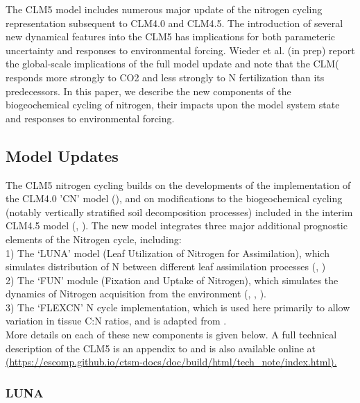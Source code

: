 \documentclass[draft,linenumbers]{agujournal}
\begin{document}
The CLM5 model includes numerous major update of the nitrogen cycling representation subsequent to CLM4.0 and CLM4.5. The introduction of several new dynamical features into the CLM5 has implications for both parameteric uncertainty and responses to environmental forcing. Wieder et al. (in prep) report the global-scale implications of the full model update and note that the CLM( responds more strongly to CO2 and less strongly to N fertilization than its predecessors. In this paper, we describe the new components of the biogeochemical cycling of nitrogen, their impacts upon the model system state and responses to environmental forcing.


\subsection{Model Updates}

The CLM5 nitrogen cycling builds on the developments of the implementation of the CLM4.0 'CN' model (\cite{thornton2007}), and on modifications to the biogeochemical cycling (notably vertically stratified soil decomposition processes) included in the interim CLM4.5 model (\cite{koven2013}, \cite{bonan2012}). The new model integrates three major additional prognostic elements of the Nitrogen cycle, including: \\


1) The `LUNA' model (Leaf Utilization of Nitrogen for Assimilation), which simulates distribution of N between different leaf assimilation processes (\cite{xu2012}, \cite{ali2016}) \\

2) The `FUN' module (Fixation and Uptake of Nitrogen), which simulates the dynamics of Nitrogen acquisition from the environment (\cite{fisher2010fun}, \cite{brzostek2014}, \cite{shi2016}).\\

3) The `FLEXCN' N cycle implementation, which is used here primarily to allow variation in tissue C:N ratios, and is adapted from \cite{ghimire2016}.\\



More details on each of these new components is given below. A full technical description of the CLM5 is an appendix to \cite{lawrence2018} and is also available online at \url{(https://escomp.github.io/ctsm-docs/doc/build/html/tech_note/index.html).}


\subsubsection{LUNA}
\end{document}

